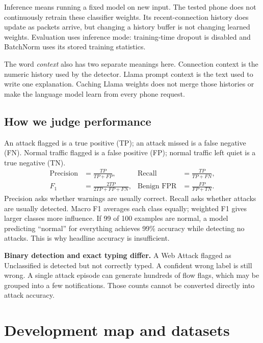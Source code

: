 \documentclass[11pt,a4paper,oneside]{report}
\begin{document}
Inference means running a fixed model on new input. The tested phone does not continuously retrain these classifier weights. Its recent-connection history does update as packets arrive, but changing a history buffer is not changing learned weights. Evaluation uses inference mode: training-time dropout is disabled and BatchNorm uses its stored training statistics.

The word \emph{context} also has two separate meanings here. Connection context is the numeric history used by the detector. Llama prompt context is the text used to write one explanation. Caching Llama weights does not merge those histories or make the language model learn from every phone request.

\section{How we judge performance}
An attack flagged is a true positive (TP); an attack missed is a false negative (FN). Normal traffic flagged is a false positive (FP); normal traffic left quiet is a true negative (TN).
\begin{align*}
\text{Precision}&=\frac{TP}{TP+FP}, & \text{Recall}&=\frac{TP}{TP+FN},\\
F_1&=\frac{2TP}{2TP+FP+FN}, & \text{Benign FPR}&=\frac{FP}{FP+TN}.
\end{align*}
Precision asks whether warnings are usually correct. Recall asks whether attacks are usually detected. Macro F1 averages each class equally; weighted F1 gives larger classes more influence. If 99 of 100 examples are normal, a model predicting ``normal'' for everything achieves 99\% accuracy while detecting no attacks. This is why headline accuracy is insufficient.

\textbf{Binary detection and exact typing differ.} A Web Attack flagged as Unclassified is detected but not correctly typed. A confident wrong label is still wrong. A single attack episode can generate hundreds of flow flags, which may be grouped into a few notifications. Those counts cannot be converted directly into attack accuracy.

\chapter{Development map and datasets}
\end{document}
